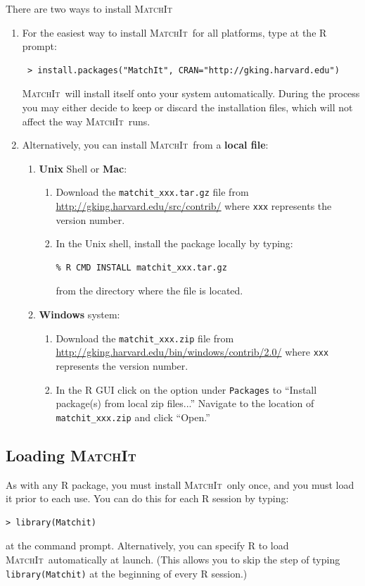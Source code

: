 \documentclass[oneside,letterpaper,titlepage]{article}
\newcommand{\MatchIt}{\textsc{MatchIt}}
\begin{document}
There are two ways to install \MatchIt\: 

\begin{enumerate} 
\item For the easiest way to install \MatchIt\ for all platforms,
  type at the R prompt:
\begin{verbatim}
 > install.packages("MatchIt", CRAN="http://gking.harvard.edu")
\end{verbatim}

  \noindent \MatchIt\ will  install itself onto
  your system automatically.  During the process you may either decide
  to keep or discard the installation files, which will not affect the
  way \MatchIt\ runs.

\item Alternatively, you can install \MatchIt\ from a \textbf{local file}:
  \begin{enumerate} 
  \item \textbf{Unix} Shell or \textbf{Mac}:
    \begin{enumerate}
    \item Download the \texttt{matchit\_xxx.tar.gz} file from
      \url{http://gking.harvard.edu/src/contrib/} where \texttt{xxx}
      represents the version number.
    \item In the Unix shell, install the package locally by typing:
\begin{verbatim}
% R CMD INSTALL matchit_xxx.tar.gz   
\end{verbatim}
      from the directory where the file is located.
    \end{enumerate}
  \item \textbf{Windows} system:
    \begin{enumerate}
    \item Download the \texttt{matchit\_xxx.zip} file from 
      \url{http://gking.harvard.edu/bin/windows/contrib/2.0/} where
      \texttt{xxx} represents the version number.
    \item In the R GUI click on the option under \texttt{Packages} to
      ``Install package(s) from local zip files...''  Navigate to the
      location of \texttt{matchit\_xxx.zip} and click ``Open.''
    \end{enumerate}
  \end{enumerate}
\end{enumerate}

\subsection{Loading \MatchIt}
As with any R package, you must install \MatchIt\ only once, and you
must load it prior to each use.  You can do this for each R session by
typing:
\begin{verbatim}
> library(Matchit) 
\end{verbatim}
at the command prompt.  Alternatively, you can specify R to load
\MatchIt\ automatically at launch.  (This allows you to skip the step
of typing {\tt library(Matchit)} at the beginning of every R session.)
 
\end{document}
